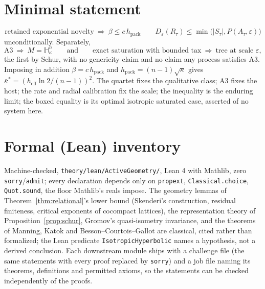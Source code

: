 \documentclass[11pt,reqno]{amsart}
\theoremstyle{plain}
\theoremstyle{definition}
\newcommand{\hpack}{h_{\mathrm{pack}}}
\newcommand{\heff}{h_{\mathrm{eff}}}
\newcommand{\Hk}{\mathbb{H}^n_\kappa}
\newcommand{\eps}{\varepsilon}
\begin{document}
\section{Minimal statement}
\[
\boxed{\text{retained exponential novelty}\ \Longrightarrow\ \beta\le c\,\hpack}\qquad
\boxed{D_\eps(R_\tau)\le\min\bigl(|S_\tau|,P(A_\tau,\eps)\bigr)}
\]
unconditionally. Separately,
\[
\boxed{\text{A3}\ \Longrightarrow\ M=\Hk}\qquad\text{and}\qquad
\boxed{\text{exact saturation with bounded tax}\ \Longrightarrow\ \text{tree at scale }\eps},
\]
the first by Schur, with no genericity claim and no claim any process satisfies A3. Imposing in addition $\beta=c\,\hpack$ and $\hpack=(n-1)\sqrt\kappa$ gives $\bar\kappa^*=(\heff\ln2/(n-1))^2$. The quartet fixes the qualitative class; A3 fixes the host; the rate and radial calibration fix the scale; the inequality is the enduring limit; the boxed equality is its optimal isotropic saturated case, asserted of no system here.

\section{Formal (Lean) inventory}
Machine-checked, \texttt{theory/lean/ActiveGeometry/}, Lean 4 with Mathlib, zero \texttt{sorry}/\texttt{admit}; every declaration depends only on \texttt{propext}, \texttt{Classical.choice}, \texttt{Quot.sound}, the floor Mathlib's reals impose. The geometry lemmas of Theorem~\ref{thm:relational}'s lower bound (Skenderi's construction, residual finiteness, critical exponents of cocompact lattices), the representation theory of Proposition~\ref{prop:schur}, Gromov's quasi-isometry invariance, and the theorems of Manning, Katok and Besson--Courtois--Gallot are classical, cited rather than formalized; the Lean predicate \texttt{IsotropicHyperbolic} names a hypothesis, not a derived conclusion. Each downstream module ships with a challenge file (the same statements with every proof replaced by \texttt{sorry}) and a job file naming its theorems, definitions and permitted axioms, so the statements can be checked independently of the proofs.
\end{document}
